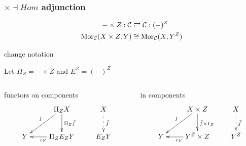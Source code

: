 \begin{frame}[t]
\frametitle{$\times \dashv Hom$ adjunction}
\begin{block}{}
\abovedisplayskip=0pt
\begin{align*}
- \times Z: \mathcal{C} & \rightleftarrows \mathcal{C}: (-)^Z\\
\mathop{\rm Mor}\nolimits_{\mathcal{C}}(X \times Z, Y) & \cong  \mathop{\rm Mor}\nolimits_{\mathcal{C}}(X, Y^Z)
\end{align*}
\end{block}
\begin{block}{change notation}
	\begin{center}
	Let $\Pi_Z = - \times Z$ and $E^Z = (-)^Z$
	\end{center}
\end{block}
\begin{columns}[t]
    \begin{column}{0.5\textwidth}
		\begin{block}{functors on components}
		\abovedisplayskip=0pt
			$$
			\xymatrix{
			& \Pi_Z X \ar[d]^{\Pi_Z \bar{f}} \ar[dl]_{f} & X \ar@{.>}[d]^{\bar{f}}\\
			Y & \Pi_Z E_Z Y \ar[l]^{\epsilon_Y} & E_Z Y}
			$$
		\end{block}		
    \end{column}
    \begin{column}{0.5\textwidth}
		\begin{block}{in components}
		\abovedisplayskip=0pt
			$$
			\xymatrix{
			& X \times Z \ar[d]^{\bar{f} \times 1_Z} \ar[dl]_{f} & X \ar@{.>}[d]^{\bar{f}}\\
			Y & Y^Z \times Z \ar[l]^{\epsilon_Y} & Y^Z}
			$$
		\end{block}
    \end{column}
\end{columns}
\end{frame}